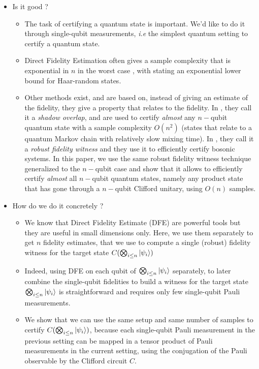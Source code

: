 \documentclass[a4paper,unpublished,onecolumn,11pt]{quantumarticle}
\begin{document}
\begin{itemize}
    \item Is it good ? 
    \begin{itemize}
        \item The task of certifying a quantum state is important. We'd like to do it through single-qubit measurements, \textit{i.e} the simplest quantum setting to certify a quantum state.
        \item Direct Fidelity Estimation often gives a sample complexity that is exponential in $n$ in the worst case \cite{FL11:direct, SLP11:practical, FOS24:optimal}, with \cite{FOS24:optimal} stating an exponential lower bound for Haar-random states.
        \item Other methods exist, and are based on, instead of giving an estimate of the fidelity, they give a property that relates to the fidelity. In \cite{HPS24:certifying}, they call it a \textit{shadow overlap}, and are used to certify \textit{almost} any $n-$qubit quantum state with a sample complexity $O(n^2)$ (states that relate to a quantum Markov chain with relatively slow mixing time). In \cite{CGKM21:efficient, UC24:efficient}, they call it a \textit{robust fidelity witness} and they use it to efficiently certify bosonic systems. In this paper, we use the same robust fidelity witness technique generalized to the $n-$qubit case and show that it allows to efficiently certify \textit{almost} all $n-$qubit quantum states, namely any product state that has gone through a $n-$qubit Clifford unitary, using $O(n)$ samples.
    \end{itemize}
    \item How do we do it concretely ?
    \begin{itemize}
        \item We know that Direct Fidelity Estimate (DFE) are powerful tools but they are useful in small dimensions only. Here, we use them separately to get $n$ fidelity estimates, that we use to compute a single (robust) fidelity witness for the target state $C(\bigotimes_{i\leq n} \ket{\psi_i})$
        \item Indeed, using DFE on each qubit of $\bigotimes_{i\leq n} \ket{\psi_i}$ separately, to later combine the single-qubit fidelities to build a witness for the target state $\bigotimes_{i\leq n} \ket{\psi_i}$ is straightforward and requires only few single-qubit Pauli measurements.
        \item We show that we can use the same setup and same number of samples to certify $C(\bigotimes_{i\leq n} \ket{\psi_i})$, because each single-qubit Pauli measurement in the previous setting can be mapped in a tensor product of Pauli measurements in the current setting, using the conjugation of the Pauli observable by the Clifford circuit $C$.

\end{itemize}
\end{itemize}
\end{document}
